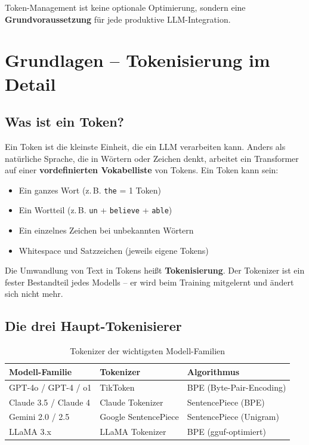 Token-Management ist keine optionale Optimierung, sondern eine \textbf{Grundvoraussetzung} für jede produktive LLM-Integration.

\section{Grundlagen -- Tokenisierung im Detail}

\subsection{Was ist ein Token?}

Ein Token ist die kleinste Einheit, die ein LLM verarbeiten kann. Anders als natürliche Sprache, die in Wörtern oder Zeichen denkt, arbeitet ein Transformer auf einer \textbf{vordefinierten Vokabelliste} von Tokens. Ein Token kann sein:
\begin{itemize}[leftmargin=*]
    \item Ein ganzes Wort (z.\,B. \texttt{the} = 1 Token)
    \item Ein Wortteil (z.\,B. \texttt{un} + \texttt{believe} + \texttt{able})
    \item Ein einzelnes Zeichen bei unbekannten Wörtern
    \item Whitespace und Satzzeichen (jeweils eigene Tokens)
\end{itemize}

Die Umwandlung von Text in Tokens heißt \textbf{Tokenisierung}. Der Tokenizer ist ein fester Bestandteil jedes Modells -- er wird beim Training mitgelernt und ändert sich nicht mehr.

\subsection{Die drei Haupt-Tokenisierer}

\begin{table}[H]
\centering
\begin{tabularx}{\linewidth}{lXX}
\toprule
\textbf{Modell-Familie} & \textbf{Tokenizer} & \textbf{Algorithmus} \\
\midrule
GPT-4o / GPT-4 / o1 & TikToken & BPE (Byte-Pair-Encoding) \\
Claude 3.5 / Claude 4 & Claude Tokenizer & SentencePiece (BPE) \\
Gemini 2.0 / 2.5 & Google SentencePiece & SentencePiece (Unigram) \\
LLaMA 3.x & LLaMA Tokenizer & BPE (gguf-optimiert) \\
\midrule
\end{tabularx}
\caption{Tokenizer der wichtigsten Modell-Familien}
\label{tab:tokenizer-vergleich}
\end{table}

